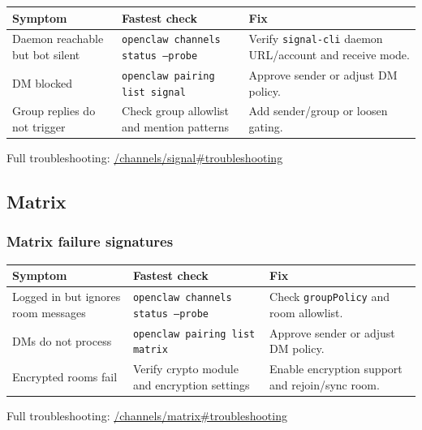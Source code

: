 \begin{table}[h]
\centering
\small
\begin{tabular}{|l|l|l|}
\hline
Symptom & Fastest check & Fix \\
\hline
Daemon reachable but bot silent & \texttt{openclaw channels status --probe} & Verify \texttt{signal-cli} daemon URL/account and receive mode. \\
\hline
DM blocked & \texttt{openclaw pairing list signal} & Approve sender or adjust DM policy. \\
\hline
Group replies do not trigger & Check group allowlist and mention patterns & Add sender/group or loosen gating. \\
\hline
\end{tabular}
\end{table}



Full troubleshooting: \href{/channels/signal\#troubleshooting}{/channels/signal\#troubleshooting}

\subsection{Matrix}


\subsubsection{Matrix failure signatures}



\begin{table}[h]
\centering
\small
\begin{tabular}{|l|l|l|}
\hline
Symptom & Fastest check & Fix \\
\hline
Logged in but ignores room messages & \texttt{openclaw channels status --probe} & Check \texttt{groupPolicy} and room allowlist. \\
\hline
DMs do not process & \texttt{openclaw pairing list matrix} & Approve sender or adjust DM policy. \\
\hline
Encrypted rooms fail & Verify crypto module and encryption settings & Enable encryption support and rejoin/sync room. \\
\hline
\end{tabular}
\end{table}



Full troubleshooting: \href{/channels/matrix\#troubleshooting}{/channels/matrix\#troubleshooting}


